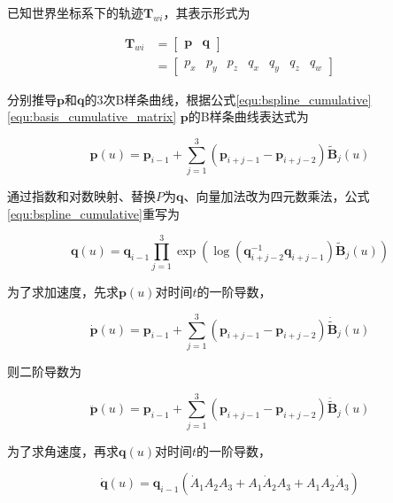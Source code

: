 \documentclass[12pt,a4paper]{article}
\begin{document}
已知世界坐标系下的轨迹$\mathbf{T}_{wi}$，其表示形式为

\begin{equation}
\begin{aligned}
\mathbf{T}_{wi} 
&= \begin{bmatrix} \mathbf{p} & \mathbf{q} \end{bmatrix} \\
&= \begin{bmatrix} p_x & p_y & p_z & q_x & q_y & q_z & q_w \end{bmatrix}
\end{aligned}
\end{equation}

分别推导$\mathbf{p}$和$\mathbf{q}$的3次B样条曲线，根据公式\eqref{equ:bspline_cumulative}\eqref{equ:basis_cumulative_matrix} $\mathbf{p}$的B样条曲线表达式为

\begin{equation}
\mathbf{p}(u) = 
\mathbf{p}_{i-1} + \sum_{j=1}^3 (\mathbf{p}_{i+j-1} - \mathbf{p}_{i+j-2}) \tilde{\mathbf{B}}_j(u)
\end{equation}

通过指数和对数映射、替换$P$为$\mathbf{q}$、向量加法改为四元数乘法\cite{kim1995general}，公式\eqref{equ:bspline_cumulative}重写为

\begin{equation}
\mathbf{q}(u) = \mathbf{q}_{i-1} 
\prod_{j=1}^3 \exp(\log(\mathbf{q}_{i+j-2}^{-1}\mathbf{q}_{i+j-1})\tilde{\mathbf{B}}_j(u))
\end{equation}

为了求加速度，先求$\mathbf{p}(u)$对时间$t$的一阶导数，

\begin{equation}
\dot{\mathbf{p}}(u) = \mathbf{p}_{i-1} + \sum_{j=1}^3 (\mathbf{p}_{i+j-1} - \mathbf{p}_{i+j-2}) \dot{\tilde{\mathbf{B}}}_j(u)
\end{equation}

则二阶导数为

\begin{equation}
\ddot{\mathbf{p}}(u) = \mathbf{p}_{i-1} + \sum_{j=1}^3 (\mathbf{p}_{i+j-1} - \mathbf{p}_{i+j-2}) \ddot{\tilde{\mathbf{B}}}_j(u)
\end{equation}

为了求角速度，再求$\mathbf{q}(u)$对时间$t$的一阶导数，

\begin{equation}
\dot{\mathbf{q}}(u) = \mathbf{q}_{i-1} 
(\dot{A}_1 A_2 A_3 + A_1 \dot{A}_2 A_3 + A_1 A_2 \dot{A}_3)
\end{equation}
\end{document}
